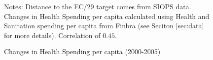 \begin{figure}[h!]
\begin{center}
    \caption{Changes in Health Spending per capita (2000-2005)}
\end{center}

\scriptsize{Notes: Distance to the EC/29 target comes from SIOPS data. Changes in Health Spending per capita calculated using Health and Sanitation spending per capita from Finbra (see Seciton \ref{sec:data} for more details). Correlation of $0.45$.}

\end{figure}